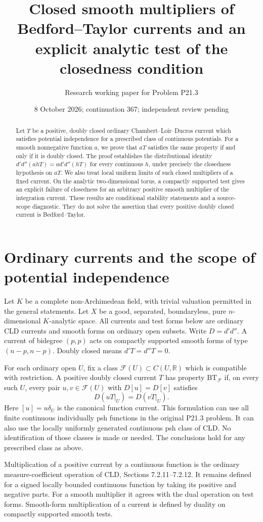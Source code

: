 \documentclass[11pt]{article}
\title{Closed smooth multipliers of Bedford--Taylor currents\newline
and an explicit analytic test of the closedness condition}
\author{Research working paper for Problem P21.3}
\date{8 October 2026; continuation 367; independent review pending}
\newcommand{\dp}{d'}
\newcommand{\ddp}{d''}
\newcommand{\D}{d'd''}
\newcommand{\BT}{\mathrm{BT}}
\begin{document}
\maketitle
\begin{abstract}
Let $T$ be a positive, doubly closed ordinary Chambert--Loir--Ducros
current which satisfies potential independence for a prescribed class of
continuous potentials. For a smooth nonnegative function $a$, we prove
that $aT$ satisfies the same property if and only if it is doubly closed.
The proof establishes the distributional identity
$\D(a hT)=a\D(hT)$ for every continuous $h$, under precisely the
closedness hypothesis on $aT$. We also treat local uniform limits of such
closed multipliers of a fixed current. On the analytic two-dimensional
torus, a compactly supported test gives an explicit failure of closedness
for an arbitrary positive smooth multiplier of the integration current.
These results are conditional stability statements and a source-scope
diagnostic. They do not solve the assertion that every positive doubly
closed current is Bedford--Taylor.
\end{abstract}

\section{Ordinary currents and the scope of potential independence}
Let $K$ be a complete non-Archimedean field, with trivial valuation
permitted in the general statements. Let $X$ be a good, separated,
boundaryless, pure $n$-dimensional $K$-analytic space. All currents and
test forms below are ordinary CLD currents and smooth forms on ordinary
open subsets. Write $D=\dp\ddp$. A current of bidegree $(p,p)$ acts on
compactly supported smooth forms of type $(n-p,n-p)$. Doubly closed
means $\dp T=\ddp T=0$.

For each ordinary open $U$, fix a class $\mathcal F(U)\subset C(U,\mathbb R)$
which is compatible with restriction. A positive doubly closed current
$T$ has property $\BT_{\mathcal F}$ if, on every such $U$, every pair
$u,v\in\mathcal F(U)$ with $D[u]=D[v]$ satisfies
\[
 D(uT|_U)=D(vT|_U).
\]
Here $[u]=u\delta_U$ is the canonical function current. This formulation
can use all finite continuous individually psh functions in the original
P21.3 problem. It can also use the locally uniformly generated continuous
psh class of CLD. No identification of those classes is made or needed.
The conclusions hold for any prescribed class as above.

Multiplication of a positive current by a continuous function is the
ordinary measure-coefficient operation of CLD, Sections 7.2.11--7.2.12.
It remains defined for a signed locally bounded continuous function by
taking its positive and negative parts. For a smooth multiplier it agrees
with the dual operation on test forms. Smooth-form multiplication of a
current is defined by duality on compactly supported smooth tests.
\end{document}
